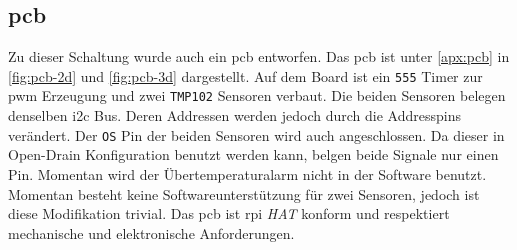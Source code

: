 \subsection{\acrshort{pcb}}

Zu dieser Schaltung wurde auch ein \gls{pcb} entworfen.
Das \gls{pcb} ist unter \autoref{apx:pcb} in \autoref{fig:pcb-2d} und \autoref{fig:pcb-3d} dargestellt.
Auf dem Board ist ein \texttt{555} Timer zur \gls{pwm} Erzeugung und zwei \texttt{TMP102} Sensoren verbaut.
Die beiden Sensoren belegen denselben \gls{i2c} Bus.
Deren Addressen werden jedoch durch die Addresspins verändert.
Der \texttt{OS} Pin der beiden Sensoren wird auch angeschlossen.
Da dieser in Open-Drain Konfiguration benutzt werden kann, belgen beide Signale nur einen Pin.
Momentan wird der Übertemperaturalarm nicht in der Software benutzt.
Momentan besteht keine Softwareunterstützung für zwei Sensoren, jedoch ist diese Modifikation trivial.
Das \gls{pcb} ist \gls{rpi} \textit{HAT} konform und respektiert mechanische und elektronische Anforderungen.
